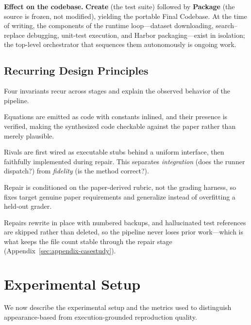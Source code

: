 \documentclass[11pt]{article}
\begin{document}
\textbf{Effect on the codebase.} \textbf{Create} (the test suite) followed by \textbf{Package} (the source is frozen, not modified), yielding the portable Final Codebase. At the time of writing, the components of the runtime loop---dataset downloading, search--replace debugging, unit-test execution, and Harbor packaging---exist in isolation; the top-level orchestrator that sequences them autonomously is ongoing work.

\subsection{Recurring Design Principles}

Four invariants recur across stages and explain the observed behavior of the pipeline.
\begin{description}[leftmargin=1em,itemsep=1pt,topsep=2pt]
  \item[\textbf{P1: Equation-literal synthesis.}] Equations are emitted as code with constants inlined, and their presence is verified, making the synthesized code checkable against the paper rather than merely plausible.
  \item[\textbf{P2: Stub-then-implement baselines.}] Rivals are first wired as executable stubs behind a uniform interface, then faithfully implemented during repair. This separates \emph{integration} (does the runner dispatch?) from \emph{fidelity} (is the method correct?).
  \item[\textbf{P3: Grader-independent, rubric-driven repair.}] Repair is conditioned on the paper-derived rubric, not the grading harness, so fixes target genuine paper requirements and generalize instead of overfitting a held-out grader.
  \item[\textbf{P4: Non-destructive editing.}] Repairs rewrite in place with numbered backups, and hallucinated test references are skipped rather than deleted, so the pipeline never loses prior work---which is what keeps the file count stable through the repair stage (Appendix~\ref{sec:appendix-casestudy}).
\end{description}



\section{Experimental Setup}

We now describe the experimental setup and the metrics used to distinguish appearance-based from execution-grounded reproduction quality.
\end{document}
